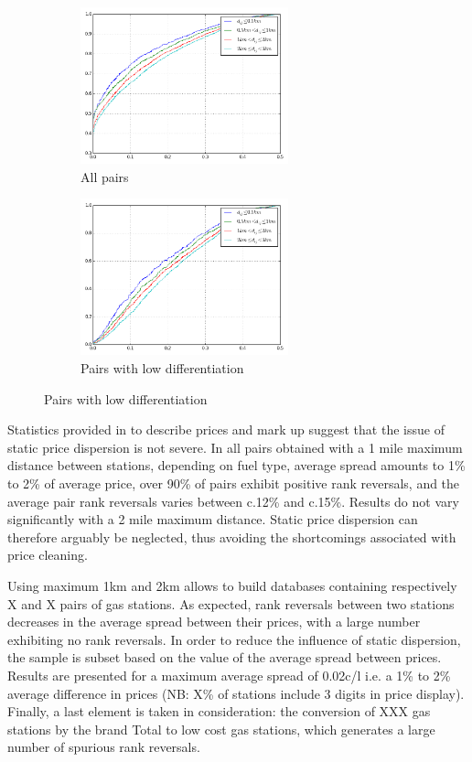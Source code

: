 \documentclass[11pt]{article}
\begin{document}
\begin{figure}[H]
\centering
\begin{subfigure}{.4\linewidth}
\centering
\includegraphics[width=6cm]{graphs/ecdf_rr_all.png}
\caption[short]{All pairs}
\end{subfigure}
\begin{subfigure}{.4\linewidth}
\centering
\includegraphics[width=6cm]{graphs/ecdf_rr_nodiff.png}
\caption[short]{Pairs with low differentiation}
\end{subfigure}
\end{figure}

Statistics provided in \cite{TAP11} to describe prices and mark up suggest that the issue of static price dispersion is not severe. In all pairs obtained with a 1 mile maximum distance between stations, depending on fuel type, average spread amounts to 1\% to 2\% of average price, over 90\% of pairs exhibit positive rank reversals, and the average pair rank reversals varies between c.12\% and c.15\%. Results do not vary significantly with a 2 mile maximum distance. Static price dispersion can therefore arguably be neglected, thus avoiding the shortcomings associated with price cleaning.

Using maximum 1km and 2km allows to build databases containing respectively X and X pairs of gas stations. As expected, rank reversals between two stations decreases in the average spread between their prices, with a large number exhibiting no rank reversals. In order to reduce the influence of static dispersion, the sample is subset based on the value of the average spread between prices. Results are presented for a maximum average spread of 0.02c/l i.e. a 1\% to 2\% average difference in prices (NB: X\% of stations include 3 digits in price display). Finally, a last element is taken in consideration: the conversion of XXX gas stations by the brand Total to low cost gas stations, which generates a large number of spurious rank reversals.
\end{document}
